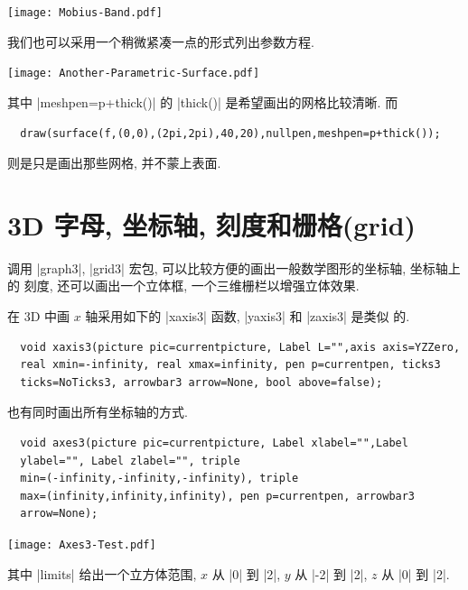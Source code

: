 \documentclass[nofonts,CJKnormalspaces]{ctexbook}
\begin{document}
\begin{center}\texttt{[image: Mobius-Band.pdf]}\end{center}%

我们也可以采用一个稍微紧凑一点的形式列出参数方程.
\begin{center}\texttt{[image: Another-Parametric-Surface.pdf]}\end{center}%

其中 |meshpen=p+thick()| 的 |thick()|  是希望画出的网格比较清晰.  而
\begin{lstlisting}
  draw(surface(f,(0,0),(2pi,2pi),40,20),nullpen,meshpen=p+thick());
\end{lstlisting}
则是只是画出那些网格, 并不蒙上表面.

\section{3D 字母, 坐标轴, 刻度和栅格(grid)}
调用 |graph3|, |grid3| 宏包, 可以比较方便的画出一般数学图形的坐标轴, 坐标轴上的
刻度, 还可以画出一个立体框, 一个三维栅栏以增强立体效果.

在 3D 中画 $x$ 轴采用如下的 |xaxis3| 函数, |yaxis3| 和 |zaxis3| 是类似
的.
\begin{lstlisting}
  void xaxis3(picture pic=currentpicture, Label L="",axis axis=YZZero,
  real xmin=-infinity, real xmax=infinity, pen p=currentpen, ticks3
  ticks=NoTicks3, arrowbar3 arrow=None, bool above=false);
\end{lstlisting}
也有同时画出所有坐标轴的方式.
\begin{lstlisting}
  void axes3(picture pic=currentpicture, Label xlabel="",Label
  ylabel="", Label zlabel="", triple
  min=(-infinity,-infinity,-infinity), triple
  max=(infinity,infinity,infinity), pen p=currentpen, arrowbar3
  arrow=None);
\end{lstlisting}
\begin{center}\texttt{[image: Axes3-Test.pdf]}\end{center}%

其中 |limits| 给出一个立方体范围, $x$ 从 |0| 到 |2|, $y$ 从 |-2| 到 |2|, $z$
从 |0| 到 |2|.
\end{document}
